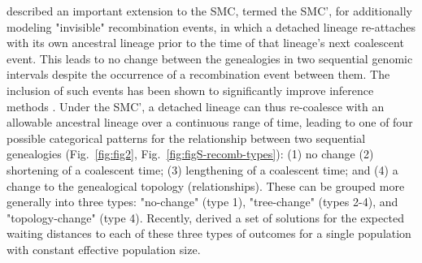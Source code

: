 \documentclass[11pt]{article}
\begin{document}
\cite{marjoram2006fast}
described an important extension to the SMC, termed the SMC', for additionally
modeling "invisible" recombination events, in which a detached lineage re-attaches
with its own ancestral lineage prior to the time of that lineage's next coalescent event. 
This leads to no change between the genealogies in two sequential genomic intervals
despite the occurrence of a recombination event between them. The inclusion of
such events has been shown to 
significantly improve inference methods \citep{wilton2015smc}. 
Under the SMC', a detached lineage can thus re-coalesce with an allowable 
ancestral lineage over a continuous range of time, leading to one of 
four possible categorical patterns for the relationship between two
sequential genealogies
(Fig.~\ref{fig:fig2}, Fig.~\ref{fig:figS-recomb-types}): 
(1) no change %
(2) shortening of a coalescent time; (3) lengthening of a coalescent time; 
and (4) %
a change to the genealogical topology (relationships).
These can be grouped more generally into three types: 
"no-change" (type 1), "tree-change" (types 2-4), and "topology-change"
(type 4). Recently, \citet{deng_distribution_2021} derived a set of solutions for
the expected waiting distances to each of these three types of 
outcomes for a single population with constant effective population size.
\end{document}
